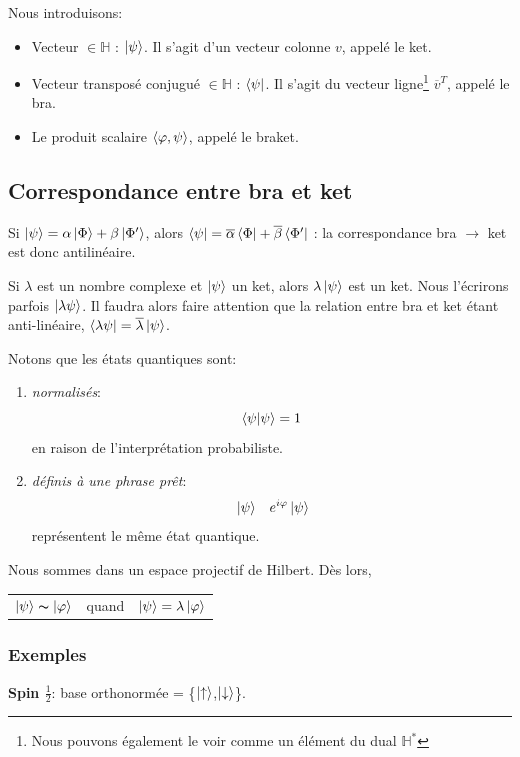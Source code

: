 \documentclass[../notesdecours.tex]{subfiles}
\begin{document}
Nous introduisons:
\begin{itemize}
\item Vecteur $\in \mathbb{H}$ : $\ket{\psi}$. Il s'agit d'un vecteur colonne $v$, appelé le ket.
\item Vecteur transposé conjugué $\in \mathbb{H}$ : $\bra{\psi}$. Il s'agit du vecteur ligne\footnote{Nous pouvons également le voir comme un élément du dual $\mathbb{H}^*$} $\overline{v}^T$, appelé le bra.
\item Le produit scalaire $\braket{\varphi,\psi}$, appelé le braket.
\end{itemize}
\subsection{Correspondance entre bra et ket}
Si $\ket{\psi} = \alpha \ket{\Phi} + \beta\ket{\Phi'}$, alors $\bra{\psi} = \overline{\alpha}\bra{\Phi}+\overline{\beta}\bra{\Phi'}$ : la correspondance bra $\rightarrow$ ket est donc antilinéaire. 
\begin{remark} Si $\lambda$ est un nombre complexe et $\ket{\psi}$ un ket, alors $\lambda\ket{\psi}$ est un ket. Nous l'écrirons parfois $\ket{\lambda\psi}$. Il faudra alors faire attention que la relation entre bra et ket étant anti-linéaire, $\bra{\lambda\psi} = \overline{\lambda}\ket{\psi}$. \end{remark}

Notons que les états quantiques sont:
\begin{enumerate}
\item \emph{normalisés}:
\begin{equation}
\braket{\psi|\psi} = 1
\end{equation}
en raison de l'interprétation probabiliste.
\item \emph{définis à une phrase prêt}:
\begin{align}
&\ket{\psi} 	&e^{i\varphi}\ket{\psi}
\end{align}
représentent le même état quantique.
\end{enumerate}
Nous sommes dans un espace projectif de Hilbert. Dès lors,

\begin{center}
\begin{tabular}{ c c c } 
$\ket{\psi} \thicksim \ket{\varphi}$ & quand & $\ket{\psi} = \lambda\ket{\varphi}$  
\end{tabular}
\end{center}

\subsubsection{Exemples}
\textbf{Spin $\frac{1}{2}$}: base orthonormée = \bigg\{$\ket{\uparrow}$,$\ket{\downarrow}$\bigg\}.\\
\end{document}
